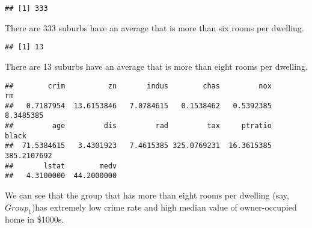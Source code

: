 \documentclass[]{article}
\newenvironment{Shaded}{\begin{snugshade}}{\end{snugshade}}
\newcommand{\DecValTok}[1]{\textcolor[rgb]{0.00,0.00,0.81}{#1}}
\newcommand{\KeywordTok}[1]{\textcolor[rgb]{0.13,0.29,0.53}{\textbf{#1}}}
\newcommand{\NormalTok}[1]{#1}
\newcommand{\OperatorTok}[1]{\textcolor[rgb]{0.81,0.36,0.00}{\textbf{#1}}}
\newcommand{\StringTok}[1]{\textcolor[rgb]{0.31,0.60,0.02}{#1}}
\begin{document}
\begin{Shaded}
\end{Shaded}

\begin{verbatim}
## [1] 333
\end{verbatim}

There are 333 suburbs have an average that is more than six rooms per
dwelling.

\begin{Shaded}
\end{Shaded}

\begin{verbatim}
## [1] 13
\end{verbatim}

There are 13 suburbs have an average that is more than eight rooms per
dwelling.

\begin{Shaded}
\end{Shaded}

\begin{verbatim}
##        crim          zn       indus        chas         nox          rm 
##   0.7187954  13.6153846   7.0784615   0.1538462   0.5392385   8.3485385 
##         age         dis         rad         tax     ptratio       black 
##  71.5384615   3.4301923   7.4615385 325.0769231  16.3615385 385.2107692 
##       lstat        medv 
##   4.3100000  44.2000000
\end{verbatim}

We can see that the group that has more than eight rooms per dwelling
(say, \(Group_1\))has extremely low crime rate and high median value of
owner-occupied home in \$1000s.
\end{document}
